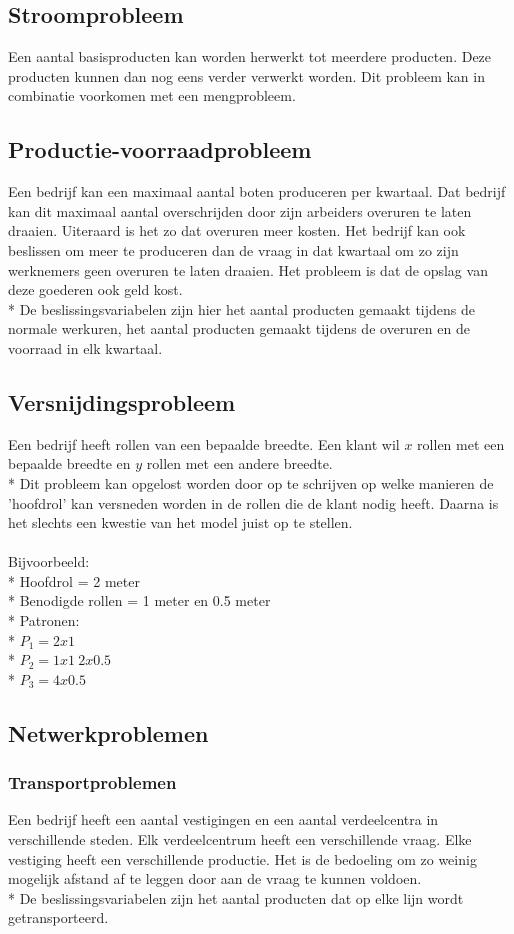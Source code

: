 \documentclass[10pt]{article}
\begin{document}
\subsection{Stroomprobleem}
Een aantal basisproducten kan worden herwerkt tot meerdere producten. Deze producten kunnen dan nog eens verder verwerkt worden. Dit probleem kan in combinatie voorkomen met een mengprobleem.
\subsection{Productie-voorraadprobleem}
Een bedrijf kan een maximaal aantal boten produceren per kwartaal. Dat bedrijf kan dit maximaal aantal overschrijden door zijn arbeiders overuren te laten draaien. Uiteraard is het zo dat overuren meer kosten. Het bedrijf kan ook beslissen om meer te produceren dan de vraag in dat kwartaal om zo zijn werknemers geen overuren te laten draaien. Het probleem is dat de opslag van deze goederen ook geld kost.\\*
De beslissingsvariabelen zijn hier het aantal producten gemaakt tijdens de normale werkuren, het aantal producten gemaakt tijdens de overuren en de voorraad in elk kwartaal.
\subsection{Versnijdingsprobleem}
Een bedrijf heeft rollen van een bepaalde breedte. Een klant wil $x$ rollen met een bepaalde breedte en $y$ rollen met een andere breedte.\\*
Dit probleem kan opgelost worden door op te schrijven op welke manieren de 'hoofdrol' kan versneden worden in de rollen die de klant nodig heeft. Daarna is het slechts een kwestie van het model juist op te stellen.\\\\
Bijvoorbeeld:\\*
Hoofdrol = 2 meter\\*
Benodigde rollen = 1 meter en 0.5 meter\\*
Patronen:\\*
$P_1 = 2x1$\\*
$P_2 = 1x1\ 2x0.5$\\*
$P_3 = 4x0.5$
\subsection{Netwerkproblemen}
\subsubsection{Transportproblemen}
Een bedrijf heeft een aantal vestigingen en een aantal verdeelcentra in verschillende steden. Elk verdeelcentrum heeft een verschillende vraag. Elke vestiging heeft een verschillende productie. Het is de bedoeling om zo weinig mogelijk afstand af te leggen door aan de vraag te kunnen voldoen.\\*
De beslissingsvariabelen zijn het aantal producten dat op elke lijn wordt getransporteerd.
\end{document}
